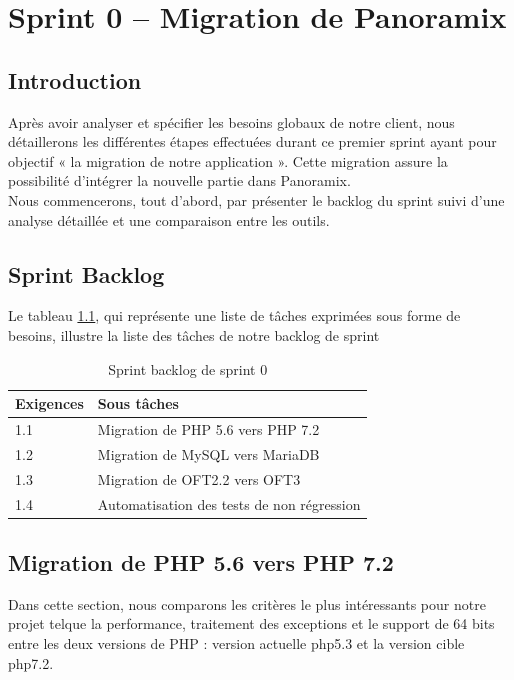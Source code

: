 \chapter{Sprint 0 – Migration de Panoramix}

\section*{Introduction}
Après avoir analyser et spécifier les besoins globaux de notre client, nous détaillerons les différentes étapes effectuées durant ce premier sprint ayant pour objectif « la migration de notre application ».  Cette migration assure la possibilité d’intégrer la nouvelle partie dans Panoramix.\\
Nous commencerons, tout d’abord, par présenter le backlog du sprint suivi d’une analyse détaillée et une comparaison entre les outils.

\section[Sprint Backlog]{Sprint Backlog}
Le tableau \ref{tab:sprint-backlog-sprint0}, qui représente une liste de tâches exprimées sous forme de besoins, illustre la liste des tâches de notre backlog de sprint
\begin{table}[H]
	\centering
	\begin{tabular}{|l|l|}
		\hline
		\rowcolor[HTML]{C0C0C0} 
		Exigences & Sous tâches                           \\ \hline
		1.1      & Migration de PHP 5.6 vers PHP 7.2    \\ \hline
		1.2      & Migration de MySQL vers MariaDB      \\ \hline
		1.3      & Migration de OFT2.2 vers OFT3        \\ \hline
		1.4      & Automatisation des tests de non régression \\ \hline
	\end{tabular}
	\captionsetup{justification=centering}
	\caption{Sprint backlog de sprint 0}
	\label{tab:sprint-backlog-sprint0}
\end{table}

\section[Migration de PHP 5.6 vers PHP 7.2]{Migration de PHP 5.6 vers PHP 7.2}
Dans cette section, nous comparons les critères le plus intéressants pour notre projet telque la performance, traitement des exceptions et le support de 64 bits entre les deux versions de PHP : version actuelle php5.3 et la version cible php7.2.


